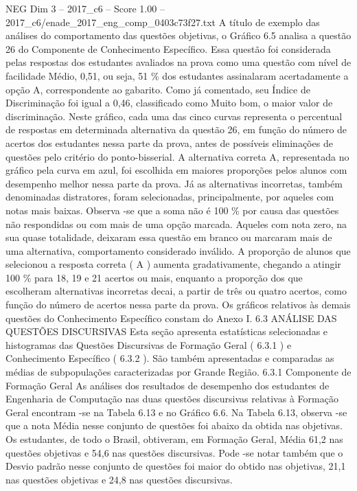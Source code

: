 \begin{textsample}{NEG Dim 3 – 2017\_c6 – Score 1.00 – 2017\_c6/enade\_2017\_eng\_comp\_0403c73f27.txt}
A título de exemplo das análises do comportamento das questões objetivas, o Gráfico 6.5 analisa a questão 26 do Componente de Conhecimento Específico.
Essa questão foi considerada pelas respostas dos estudantes avaliados na prova como uma questão com nível de facilidade Médio, 0,51, ou seja, 51 \% dos estudantes assinalaram acertadamente a opção A, correspondente ao gabarito.
Como já comentado, seu Índice de Discriminação foi igual a 0,46, classificado como Muito bom, o maior valor de discriminação.
Neste gráfico, cada uma das cinco curvas representa o percentual de respostas em determinada alternativa da questão 26, em função do número de acertos dos estudantes nessa parte da prova, antes de possíveis eliminações de questões pelo critério do ponto-bisserial.
A alternativa correta A, representada no gráfico pela curva em azul, foi escolhida em maiores proporções pelos alunos com desempenho melhor nessa parte da prova.
Já as alternativas incorretas, também denominadas distratores, foram selecionadas, principalmente, por aqueles com notas mais baixas.
Observa -se que a soma não é 100 \% por causa das questões não respondidas ou com mais de uma opção marcada.
Aqueles com nota zero, na sua quase totalidade, deixaram essa questão em branco ou marcaram mais de uma alternativa, comportamento considerado inválido.
A proporção de alunos que selecionou a resposta correta ( A ) aumenta gradativamente, chegando a atingir 100 \% para 18, 19 e 21 acertos ou mais, enquanto a proporção dos que escolheram alternativas incorretas decai, a partir de três ou quatro acertos, como função do número de acertos nessa parte da prova.
Os gráficos relativos às demais questões do Conhecimento Específico constam do Anexo I. 6.3 ANÁLISE DAS QUESTÕES DISCURSIVAS Esta seção apresenta estatísticas selecionadas e histogramas das Questões Discursivas de Formação Geral ( 6.3.1 ) e Conhecimento Específico ( 6.3.2 ).
São também apresentadas e comparadas as médias de subpopulações caracterizadas por Grande Região. 6.3.1 Componente de Formação Geral As análises dos resultados de desempenho dos estudantes de Engenharia de Computação nas duas questões discursivas relativas à Formação Geral encontram -se na Tabela 6.13 e no Gráfico 6.6.
Na Tabela 6.13, observa -se que a nota Média nesse conjunto de questões foi abaixo da obtida nas objetivas.
Os estudantes, de todo o Brasil, obtiveram, em Formação Geral, Média 61,2 nas questões objetivas e 54,6 nas questões discursivas.
Pode -se notar também que o Desvio padrão nesse conjunto de questões foi maior do obtido nas objetivas, 21,1 nas questões objetivas e 24,8 nas questões discursivas.

\end{textsample}
